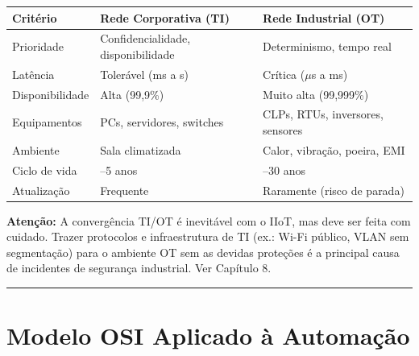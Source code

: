 \begin{longtable}[]{@{}
  >{\raggedright\arraybackslash}p{}
  >{\raggedright\arraybackslash}p{}
  >{\raggedright\arraybackslash}p{}@{}}
\toprule\noalign{}
\begin{minipage}[b]{\linewidth}\raggedright
Critério
\end{minipage} & \begin{minipage}[b]{\linewidth}\raggedright
Rede Corporativa (TI)
\end{minipage} & \begin{minipage}[b]{\linewidth}\raggedright
Rede Industrial (OT)
\end{minipage} \\
\midrule\noalign{}
\endhead
\bottomrule\noalign{}
\endlastfoot
Prioridade & Confidencialidade, disponibilidade & Determinismo, tempo real \\
Latência & Tolerável (ms a s) & Crítica (\ensuremath{\mu}s a ms) \\
Disponibilidade & Alta (99,9\%) & Muito alta (99,999\%) \\
Equipamentos & PCs, servidores, switches & CLPs, RTUs, inversores, sensores \\
Ambiente & Sala climatizada & Calor, vibração, poeira, EMI \\
Ciclo de vida & 3--5 anos & 10--30 anos \\
Atualização & Frequente & Raramente (risco de parada) \\
\end{longtable}

\begin{caixaatencao}

\textbf{Atenção:} A convergência TI/OT é inevitável com o IIoT, mas deve ser feita com cuidado. Trazer protocolos e infraestrutura de TI (ex.: Wi-Fi público, VLAN sem segmentação) para o ambiente OT sem as devidas proteções é a principal causa de incidentes de segurança industrial. Ver Capítulo 8.

\end{caixaatencao}

\begin{center}\rule{0.5\linewidth}{0.5pt}\end{center}

\section{Modelo OSI Aplicado à Automação}\label{modelo-osi-aplicado-uxe0-automauxe7uxe3o}

